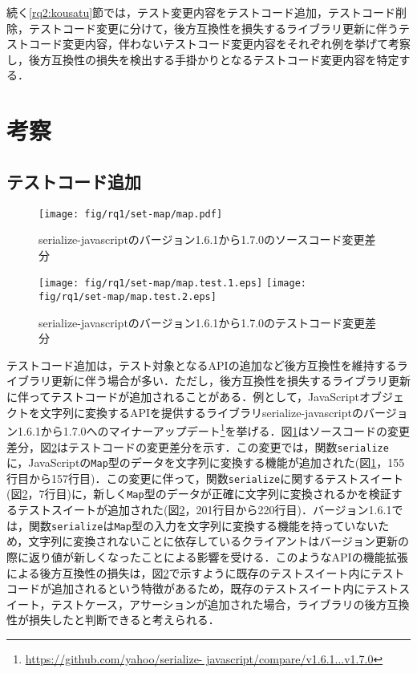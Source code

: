 \documentclass[submit]{ipsj}
\begin{document}
続く\ref{rq2:kousatu}節では，テスト変更内容をテストコード追加，テストコード削除，テストコード変更に分けて，後方互換性を損失するライブラリ更新に伴うテストコード変更内容，伴わないテストコード変更内容をそれぞれ例を挙げて考察し，後方互換性の損失を検出する手掛かりとなるテストコード変更内容を特定する．

\section{考察}\label{sec:rq1.kousatu}

\subsection{テストコード追加}\label{subsec:add-test}

\begin{figure}[t]
  \centering
  \texttt{[image: fig/rq1/set-map/map.pdf]}
  \caption{serialize-javascriptのバージョン1.6.1から1.7.0のソースコード変更差分}
  \label{fig:rq1.insert-test-src}
\end{figure}

\begin{figure}[t]
  \centering
  \texttt{[image: fig/rq1/set-map/map.test.1.eps]}
  \texttt{[image: fig/rq1/set-map/map.test.2.eps]}
  \caption{serialize-javascriptのバージョン1.6.1から1.7.0のテストコード変更差分}
  \label{fig:rq1.insert-test-test}
\end{figure}

テストコード追加は，テスト対象となるAPIの追加など後方互換性を維持するライブラリ更新に伴う場合が多い．ただし，後方互換性を損失するライブラリ更新に伴ってテストコードが追加されることがある．例として，JavaScriptオブジェクトを文字列に変換するAPIを提供するライブラリserialize-javascriptのバージョン1.6.1から1.7.0へのマイナーアップデート\footnote{\url{https://github.com/yahoo/serialize- javascript/compare/v1.6.1...v1.7.0}}を挙げる．図\ref{fig:rq1.insert-test-src}はソースコードの変更差分，図\ref{fig:rq1.insert-test-test}はテストコードの変更差分を示す．この変更では，関数{\verb|serialize|}に，JavaScriptの{\verb|Map|}型のデータを文字列に変換する機能が追加された(図\ref{fig:rq1.insert-test-src}，155行目から157行目)．この変更に伴って，関数{\verb|serialize|}に関するテストスイート(図\ref{fig:rq1.insert-test-test}，7行目)に，新しく{\verb|Map|}型のデータが正確に文字列に変換されるかを検証するテストスイートが追加された(図\ref{fig:rq1.insert-test-test}，201行目から220行目)．バージョン1.6.1では，関数{\verb|serialize|}は{\verb|Map|}型の入力を文字列に変換する機能を持っていないため，文字列に変換されないことに依存しているクライアントはバージョン更新の際に返り値が新しくなったことによる影響を受ける．このようなAPIの機能拡張による後方互換性の損失は，図\ref{fig:rq1.insert-test-test}で示すように既存のテストスイート内にテストコードが追加されるという特徴があるため，既存のテストスイート内にテストスイート，テストケース，アサーションが追加された場合，ライブラリの後方互換性が損失したと判断できると考えられる．
\end{document}
